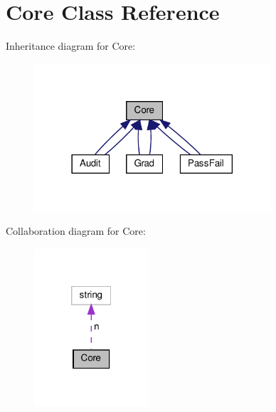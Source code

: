 \hypertarget{classCore}{}\section{Core Class Reference}
\label{classCore}


Inheritance diagram for Core\+:
\nopagebreak
\begin{figure}[H]
\begin{center}
\leavevmode
\includegraphics[width=249pt]{classCore__inherit__graph}
\end{center}
\end{figure}


Collaboration diagram for Core\+:
\nopagebreak
\begin{figure}[H]
\begin{center}
\leavevmode
\includegraphics[width=121pt]{classCore__coll__graph}
\end{center}
\end{figure}
